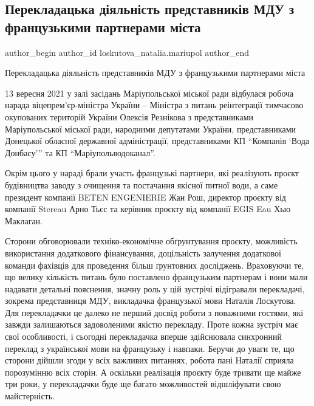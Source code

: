  
 
 
 
 

\subsection{Перекладацька діяльність представників МДУ з французькими партнерами міста}
\label{sec:13_09_2021.fb.loskutova_natalia.mariupol.1.robocha_narada}

\ifcmt
 author_begin
   author_id loskutova_natalia.mariupol
 author_end
\fi

Перекладацька діяльність представників МДУ з французькими партнерами міста

13 вересня 2021 у залі засідань Маріупольської міської ради відбулася робоча
нарада віцепрем'єр-міністра України – Міністра з питань реінтеграції тимчасово
окупованих територій України Олексія Резнікова з представниками Маріупольської
міської ради, народними депутатами України, представниками Донецької обласної
державної адміністрації, представниками КП \enquote{Компанія \enquote{Вода
Донбасу}} та КП \enquote{Маріупольводоканал}. 


Окрім цього у нараді брали участь
французькі партнери, які реалізують проєкт будівництва заводу з очищення та
постачання якісної питної води, а саме президент компанії BETEN ENGENIERIE Жан
Рош, директор проєкту від компанії Stereau Арно Тьєс та керівник проєкту від
компанії EGIS Eau Хью Маклаган. 

Сторони обговорювали техніко-економічне
обґрунтування проєкту, можливість використання додаткового фінансування,
доцільність залучення додаткової команди фахівців для проведення більш
ґрунтовних досліджень. Враховуючи те, що велику кількість питань було
поставлено французьким партнерам і вони мали надавати детальні пояснення,
значну роль у цій зустрічі відігравали перекладачі, зокрема представниця МДУ,
викладачка французької мови Наталія Лоскутова. Для перекладачки це далеко не
перший досвід роботи з поважними гостями, які завжди залишаються задоволеними
якістю перекладу. Проте кожна зустріч має свої особливості, і сьогодні
перекладачка вперше здійснювала синхронний переклад з української мови на
французьку і навпаки. Беручи до уваги те, що сторони дійшли згоди у всіх
важливих питаннях, робота пані Наталії сприяла порозумінню всіх сторін. А
оскільки реалізація проєкту буде тривати ще майже три роки, у перекладачки буде
ще багато можливостей відшліфувати свою майстерність.



